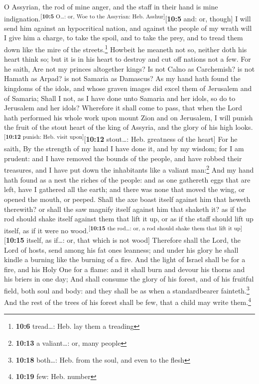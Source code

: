  O Assyrian, the rod of mine anger, and the staff in their
hand is mine indignation.\textsuperscript{{[}\textbf{10:5} O\ldots: or,
Woe to the Assyrian: Heb. Asshur{]}}{[}\textbf{10:5} and: or, though{]}
 I will send him against an hypocritical nation, and
against the people of my wrath will I give him a charge, to take the
spoil, and to take the prey, and to tread them down like the mire of the
streets.\footnote{\textbf{10:6} tread\ldots: Heb. lay them a treading}
 Howbeit he meaneth not so, neither doth his heart think
so; but it is in his heart to destroy and cut off nations not a few.
 For he saith, Are not my princes altogether kings?
 Is not Calno as Carchemish? is not Hamath as Arpad? is
not Samaria as Damascus?  As my hand hath found the
kingdoms of the idols, and whose graven images did excel them of
Jerusalem and of Samaria;  Shall I not, as I have done
unto Samaria and her idols, so do to Jerusalem and her idols?
 Wherefore it shall come to pass, that when the Lord hath
performed his whole work upon mount Zion and on Jerusalem, I will punish
the fruit of the stout heart of the king of Assyria, and the glory of
his high looks.\textsuperscript{{[}\textbf{10:12} punish: Heb. visit
upon{]}}{[}\textbf{10:12} stout\ldots: Heb. greatness of the heart{]}
 For he saith, By the strength of my hand I have done it,
and by my wisdom; for I am prudent: and I have removed the bounds of the
people, and have robbed their treasures, and I have put down the
inhabitants like a valiant man:\footnote{\textbf{10:13} a valiant\ldots:
  or, many people}  And my hand hath found as a nest the
riches of the people: and as one gathereth eggs that are left, have I
gathered all the earth; and there was none that moved the wing, or
opened the mouth, or peeped.  Shall the axe boast itself
against him that heweth therewith? or shall the saw magnify itself
against him that shaketh it? as if the rod should shake itself against
them that lift it up, or as if the staff should lift up itself, as if it
were no wood.\textsuperscript{{[}\textbf{10:15} the rod\ldots: or, a rod
should shake them that lift it up{]}}{[}\textbf{10:15} itself, as
if\ldots: or, that which is not wood{]}  Therefore shall
the Lord, the Lord of hosts, send among his fat ones leanness; and under
his glory he shall kindle a burning like the burning of a fire.
 And the light of Israel shall be for a fire, and his
Holy One for a flame: and it shall burn and devour his thorns and his
briers in one day;  And shall consume the glory of his
forest, and of his fruitful field, both soul and body: and they shall be
as when a standardbearer fainteth.\footnote{\textbf{10:18} both\ldots:
  Heb. from the soul, and even to the flesh}  And the
rest of the trees of his forest shall be few, that a child may write
them.\footnote{\textbf{10:19} few: Heb. number}

